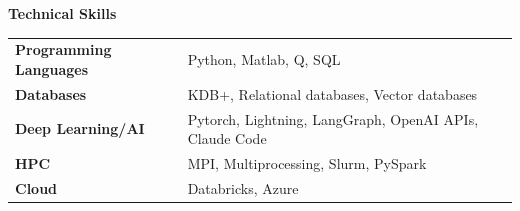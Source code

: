 \documentclass{article}
\begin{document}
\vspace{0.25in}


{\Large\bf Technical Skills} \hrulefill \\

\begin{tabular}{p{1.8in}p{6in}}
    {\bf Programming Languages}&Python, Matlab, Q, SQL\\
    {\bf Databases}&KDB+, Relational databases, Vector databases\\
    {\bf Deep Learning/AI}&Pytorch, Lightning, LangGraph, OpenAI APIs, Claude Code\\
    {\bf HPC}&MPI, Multiprocessing, Slurm, PySpark\\
    {\bf Cloud}&Databricks, Azure
\end{tabular}
\end{document}
